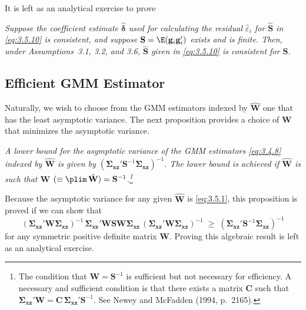 It is left as an analytical exercise to prove

\begin{proposition}
\label{prop:3.4}
\emph{Suppose the coefficient estimate $\hat{\boldsymbol{\delta}}$
used for calculating the residual $\hat{\varepsilon}_i$ for $\hat{\mathbf{S}}$ in \eqref{eq:3.5.10} is
consistent, and suppose $\mathbf{S} = \E(\mathbf{g}_i \mathbf{g}_i')$ exists and is finite.  Then,
under Assumptions~3.1, 3.2, and 3.6, $\hat{\mathbf{S}}$ given in \eqref{eq:3.5.10} is consistent
for $\mathbf{S}$.}
\end{proposition}

\subsection*{Efficient GMM Estimator}

Naturally, we wish to choose from the GMM estimators indexed by $\hat{\mathbf{W}}$ one that has
the least asymptotic variance.  The next proposition provides a choice of $\mathbf{W}$ that
minimizes the asymptotic variance.

\begin{proposition}
\label{prop:3.5}
\emph{A lower bound for the asymptotic variance of the GMM estimators \eqref{eq:3.4.8}
indexed by $\hat{\mathbf{W}}$ is given by
$(\boldsymbol{\Sigma}_{\mathbf{xz}}' \mathbf{S}^{-1} \boldsymbol{\Sigma}_{\mathbf{xz}})^{-1}$.
The lower bound is achieved if $\hat{\mathbf{W}}$ is such that
$\mathbf{W}$ $(\equiv \plim\, \hat{\mathbf{W}}) = \mathbf{S}^{-1}$.\footnote{The condition that
$\mathbf{W} = \mathbf{S}^{-1}$ is sufficient but not necessary for efficiency.  A necessary and
sufficient condition is that there exists a matrix $\mathbf{C}$ such that
$\boldsymbol{\Sigma}_{\mathbf{xz}}' \mathbf{W} = \mathbf{C}\, \boldsymbol{\Sigma}_{\mathbf{xz}}' \mathbf{S}^{-1}$.
See Newey and McFadden (1994, p.~2165).}}
\end{proposition}

Because the asymptotic variance for any given $\hat{\mathbf{W}}$ is \eqref{eq:3.5.1}, this proposition
is proved if we can show that
\begin{equation}
  (\boldsymbol{\Sigma}_{\mathbf{xz}}' \mathbf{W} \boldsymbol{\Sigma}_{\mathbf{xz}})^{-1}\,
  \boldsymbol{\Sigma}_{\mathbf{xz}}' \mathbf{W} \mathbf{S} \mathbf{W}
  \boldsymbol{\Sigma}_{\mathbf{xz}}\,
  (\boldsymbol{\Sigma}_{\mathbf{xz}}' \mathbf{W} \boldsymbol{\Sigma}_{\mathbf{xz}})^{-1}
  \;\geq\;
  (\boldsymbol{\Sigma}_{\mathbf{xz}}' \mathbf{S}^{-1} \boldsymbol{\Sigma}_{\mathbf{xz}})^{-1}
  \label{eq:3.5.11}
\end{equation}
for any symmetric positive definite matrix $\mathbf{W}$.  Proving this algebraic result is left
as an analytical exercise.

